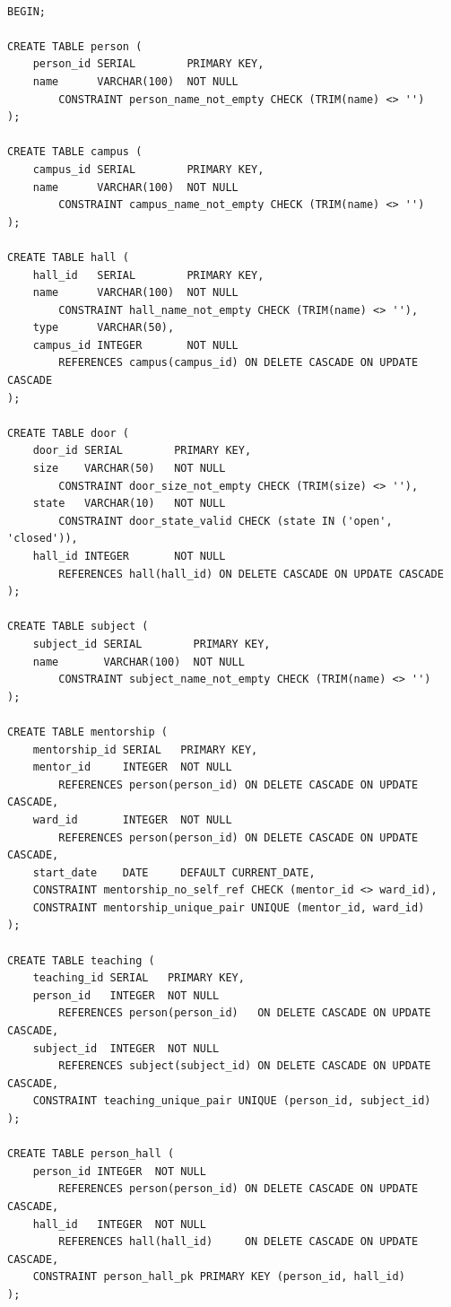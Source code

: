 \documentclass[12pt, a4paper]{article}
\begin{document}
\begin{verbatim}

BEGIN;

CREATE TABLE person (
    person_id SERIAL        PRIMARY KEY,
    name      VARCHAR(100)  NOT NULL
        CONSTRAINT person_name_not_empty CHECK (TRIM(name) <> '')
);

CREATE TABLE campus (
    campus_id SERIAL        PRIMARY KEY,
    name      VARCHAR(100)  NOT NULL
        CONSTRAINT campus_name_not_empty CHECK (TRIM(name) <> '')
);

CREATE TABLE hall (
    hall_id   SERIAL        PRIMARY KEY,
    name      VARCHAR(100)  NOT NULL
        CONSTRAINT hall_name_not_empty CHECK (TRIM(name) <> ''),
    type      VARCHAR(50),
    campus_id INTEGER       NOT NULL
        REFERENCES campus(campus_id) ON DELETE CASCADE ON UPDATE CASCADE
);

CREATE TABLE door (
    door_id SERIAL        PRIMARY KEY,
    size    VARCHAR(50)   NOT NULL
        CONSTRAINT door_size_not_empty CHECK (TRIM(size) <> ''),
    state   VARCHAR(10)   NOT NULL
        CONSTRAINT door_state_valid CHECK (state IN ('open', 'closed')),
    hall_id INTEGER       NOT NULL
        REFERENCES hall(hall_id) ON DELETE CASCADE ON UPDATE CASCADE
);

CREATE TABLE subject (
    subject_id SERIAL        PRIMARY KEY,
    name       VARCHAR(100)  NOT NULL
        CONSTRAINT subject_name_not_empty CHECK (TRIM(name) <> '')
);

CREATE TABLE mentorship (
    mentorship_id SERIAL   PRIMARY KEY,
    mentor_id     INTEGER  NOT NULL
        REFERENCES person(person_id) ON DELETE CASCADE ON UPDATE CASCADE,
    ward_id       INTEGER  NOT NULL
        REFERENCES person(person_id) ON DELETE CASCADE ON UPDATE CASCADE,
    start_date    DATE     DEFAULT CURRENT_DATE,
    CONSTRAINT mentorship_no_self_ref CHECK (mentor_id <> ward_id),
    CONSTRAINT mentorship_unique_pair UNIQUE (mentor_id, ward_id)
);

CREATE TABLE teaching (
    teaching_id SERIAL   PRIMARY KEY,
    person_id   INTEGER  NOT NULL
        REFERENCES person(person_id)   ON DELETE CASCADE ON UPDATE CASCADE,
    subject_id  INTEGER  NOT NULL
        REFERENCES subject(subject_id) ON DELETE CASCADE ON UPDATE CASCADE,
    CONSTRAINT teaching_unique_pair UNIQUE (person_id, subject_id)
);

CREATE TABLE person_hall (
    person_id INTEGER  NOT NULL
        REFERENCES person(person_id) ON DELETE CASCADE ON UPDATE CASCADE,
    hall_id   INTEGER  NOT NULL
        REFERENCES hall(hall_id)     ON DELETE CASCADE ON UPDATE CASCADE,
    CONSTRAINT person_hall_pk PRIMARY KEY (person_id, hall_id)
);


\end{verbatim}
\end{document}

